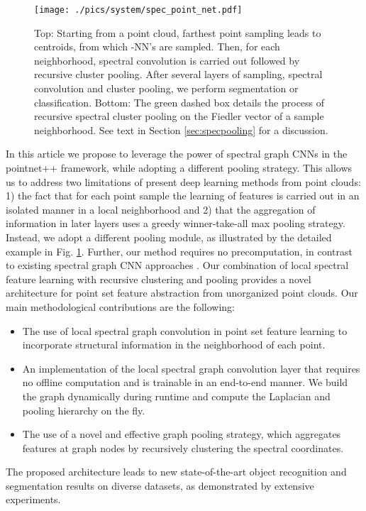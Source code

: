 \documentclass[runningheads]{llncs}
\begin{document}
\begin{figure}[!t]
  \vspace{0.3cm}
  \centerline{
  \texttt{[image: ./pics/system/spec\_point\_net.pdf]}
  }
  \vspace{0.1cm}
  \caption{{\sc Top:} Starting from a point cloud, farthest point sampling leads to centroids, from which -NN's are sampled. Then, for each neighborhood, spectral convolution is carried out followed by recursive cluster pooling. 
After several layers of sampling, spectral convolution and cluster pooling, we perform segmentation or classification.
{\sc Bottom:} The green dashed box details the process of recursive spectral cluster pooling on the Fiedler vector of a sample neighborhood. See text in Section \ref{sec:specpooling} for a discussion.
}
\label{fig:spectralpooling}
\end{figure}


In this article we propose to leverage the power of spectral graph CNNs in the pointnet++ framework, while adopting a different pooling strategy. This allows us to address two limitations of present deep learning methods from point clouds: 1) the fact that for each point sample the learning of features is carried out in an isolated manner in a local neighborhood and 2) that the aggregation of information in later layers uses a greedy winner-take-all max pooling strategy. Instead, we adopt a different pooling module, as illustrated by the detailed example in Fig. \ref{fig:spectralpooling}. 
Further, our method requires no precomputation, in contrast to existing spectral graph CNN approaches \cite{defferrard2016convolutional,kipf2016semi}. Our combination of local spectral feature learning with recursive clustering and pooling provides a novel architecture for point set feature abstraction from unorganized point clouds. Our main methodological contributions are the following:
\begin{itemize}
\item The use of local spectral graph convolution in point set feature learning to incorporate structural information in the neighborhood of each point.
\item An implementation of the local spectral graph convolution layer that requires no offline computation and is trainable in an end-to-end manner. We build the graph dynamically during runtime and compute the Laplacian and pooling hierarchy on the fly. 
\item The use of a novel and effective graph pooling strategy, which aggregates features at graph nodes by recursively clustering the spectral coordinates. 
\end{itemize}
The proposed architecture leads to new state-of-the-art object recognition and segmentation results on diverse datasets, as demonstrated by extensive experiments.
\end{document}
